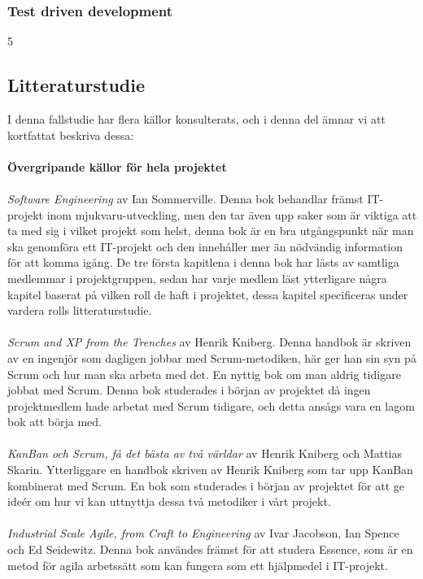 \documentclass[conference]{IEEEtran}
\begin{document}
\subsubsection{Test driven development}
5
\subsection{Litteraturstudie}
I denna fallstudie har flera källor konsulterats, och i denna del ämnar vi att kortfattat beskriva dessa:\\
\\
\textbf{Övergripande källor för hela projektet}\\
\\
\textit{Software Engineering} av Ian Sommerville\cite{Sommerville10}. Denna bok behandlar främst IT-projekt inom mjukvaru-utveckling, men den tar även upp saker som är viktiga att ta med sig i vilket projekt som helst, denna bok är en bra utgångspunkt när man ska genomföra ett IT-projekt och den innehåller mer än nödvändig information för att komma igång. De tre första kapitlena i denna bok har lästs av samtliga medlemmar i projektgruppen, sedan har varje medlem läst ytterligare några kapitel baserat på vilken roll de haft i projektet, dessa kapitel specificeras under vardera rolls litteraturstudie.\\
\\
\textit{Scrum and XP from the Trenches} av Henrik Kniberg\cite{Kniberg07}. Denna handbok är skriven av en ingenjör som dagligen jobbar med Scrum-metodiken, här ger han sin syn på Scrum och hur man ska arbeta med det. En nyttig bok om man aldrig tidigare jobbat med Scrum. Denna bok studerades i början av projektet då ingen projektmedlem hade arbetat med Scrum tidigare, och detta ansågs vara en lagom bok att börja med.\\
\\
\textit{KanBan och Scrum, få det bästa av två världar} av Henrik Kniberg och Mattias Skarin\cite{Kniberg10}. Ytterliggare en handbok skriven av Henrik Kniberg som tar upp KanBan kombinerat med Scrum. En bok som studerades i början av projektet för att ge ideér om hur vi kan uttnyttja dessa två metodiker i vårt projekt.\\
\\
\textit{Industrial Scale Agile, from Craft to Engineering} av Ivar Jacobson, Ian Spence och Ed Seidewitz\cite{Jacobson16}. Denna bok användes främst för att studera Essence, som är en metod för agila arbetssätt som kan fungera som ett hjälpmedel i IT-projekt.\\
\end{document}
